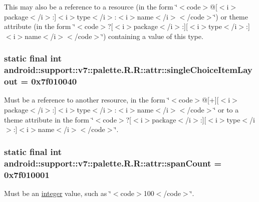 This may also be a reference to a resource (in the form \char`\"{}$<$code$>$@\mbox{[}$<$i$>$package$<$/i$>$:\mbox{]}$<$i$>$type$<$/i$>$:$<$i$>$name$<$/i$>$$<$/code$>$\char`\"{}) or theme attribute (in the form \char`\"{}$<$code$>$?\mbox{[}$<$i$>$package$<$/i$>$:\mbox{]}\mbox{[}$<$i$>$type$<$/i$>$:\mbox{]}$<$i$>$name$<$/i$>$$<$/code$>$\char`\"{}) containing a value of this type. \hypertarget{classandroid_1_1support_1_1v7_1_1palette_1_1_r_1_1attr_d4aef36297d23e4be9b7a2e8b1496b20}{
\subsubsection[{singleChoiceItemLayout}]{\setlength{\rightskip}{0pt plus 5cm}static final int android::support::v7::palette.R.R::attr::singleChoiceItemLayout = 0x7f010040}}
\label{classandroid_1_1support_1_1v7_1_1palette_1_1_r_1_1attr_d4aef36297d23e4be9b7a2e8b1496b20}


Must be a reference to another resource, in the form \char`\"{}$<$code$>$@\mbox{[}+\mbox{]}\mbox{[}$<$i$>$package$<$/i$>$:\mbox{]}$<$i$>$type$<$/i$>$:$<$i$>$name$<$/i$>$$<$/code$>$\char`\"{} or to a theme attribute in the form \char`\"{}$<$code$>$?\mbox{[}$<$i$>$package$<$/i$>$:\mbox{]}\mbox{[}$<$i$>$type$<$/i$>$:\mbox{]}$<$i$>$name$<$/i$>$$<$/code$>$\char`\"{}. \hypertarget{classandroid_1_1support_1_1v7_1_1palette_1_1_r_1_1attr_b6231987c081cfbc5b906ca5f2b938ab}{
\subsubsection[{spanCount}]{\setlength{\rightskip}{0pt plus 5cm}static final int android::support::v7::palette.R.R::attr::spanCount = 0x7f010001}}
\label{classandroid_1_1support_1_1v7_1_1palette_1_1_r_1_1attr_b6231987c081cfbc5b906ca5f2b938ab}


Must be an \hyperlink{classandroid_1_1support_1_1v7_1_1palette_1_1_r_1_1integer}{integer} value, such as \char`\"{}$<$code$>$100$<$/code$>$\char`\"{}. 

